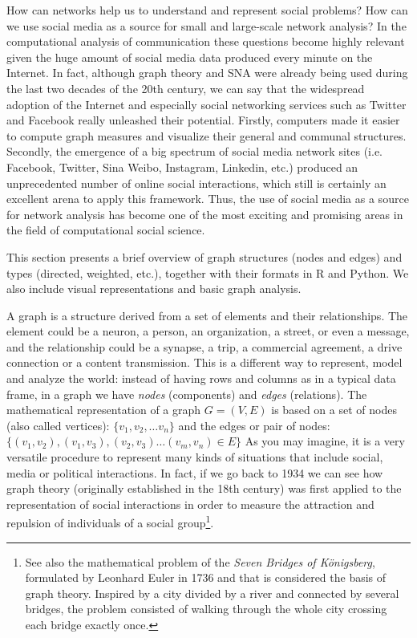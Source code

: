How can networks help us to understand and represent social problems? How can we use social media as a source for small and large-scale network analysis? In the computational analysis of communication these questions become highly relevant given the huge amount of social media data produced every minute on the Internet.  In fact, although graph theory and SNA were already being used during the last two decades of the 20th century, we can say that the widespread adoption of the Internet and especially social networking services such as Twitter and Facebook really unleashed their potential. Firstly, computers made it easier to compute graph measures and visualize their general and communal structures. Secondly, the emergence of a big spectrum of social media network sites (i.e. Facebook, Twitter, Sina Weibo, Instagram, Linkedin, etc.) produced an unprecedented number of online social interactions, which still is certainly an excellent arena to apply this framework. Thus, the use of social media as a source for network analysis has become one of the most exciting and promising areas in the field of computational social science.

This section presents a brief overview of graph structures (nodes and edges) and types (directed, weighted, etc.), together with their formats in R and Python. We also include visual representations and basic graph analysis.

A graph is a structure derived from a set of elements and their relationships. The element could be a neuron, a person, an organization, a street, or even a message, and the relationship could be a synapse, a trip, a commercial agreement, a drive connection or a content transmission. This is a different way to represent, model and analyze the world: instead of having rows and columns as in a typical data frame, in a graph we have \textit{nodes} (components) and \textit{edges} (relations).
The mathematical representation of a graph $G=(V,E)$ is based on a set of nodes (also called vertices): $\{v_{1}, v_{2},\ldots v_{n}\}$ and the edges or pair of nodes: $\{(v_{1}, v_{2}), (v_{1}, v_{3}), (v_{2},v_{3}) \ldots (v_{m}, v_{n}) \in E\}$ As you may imagine, it is a very versatile procedure to represent many kinds of situations that include social, media or political interactions. In fact, if we go back to 1934 we can see how graph theory (originally established in the 18th century) was first applied to the representation of social interactions \citep{moreno1934shall} in order to measure the attraction and repulsion of individuals of a social group\footnote{See also the mathematical problem of the \textit{Seven Bridges of K\"onigsberg}, formulated by Leonhard Euler in 1736 and that is considered the basis of graph theory. Inspired by a city divided by a river and connected by several bridges, the problem consisted of walking through the whole city crossing each bridge exactly once.}.

